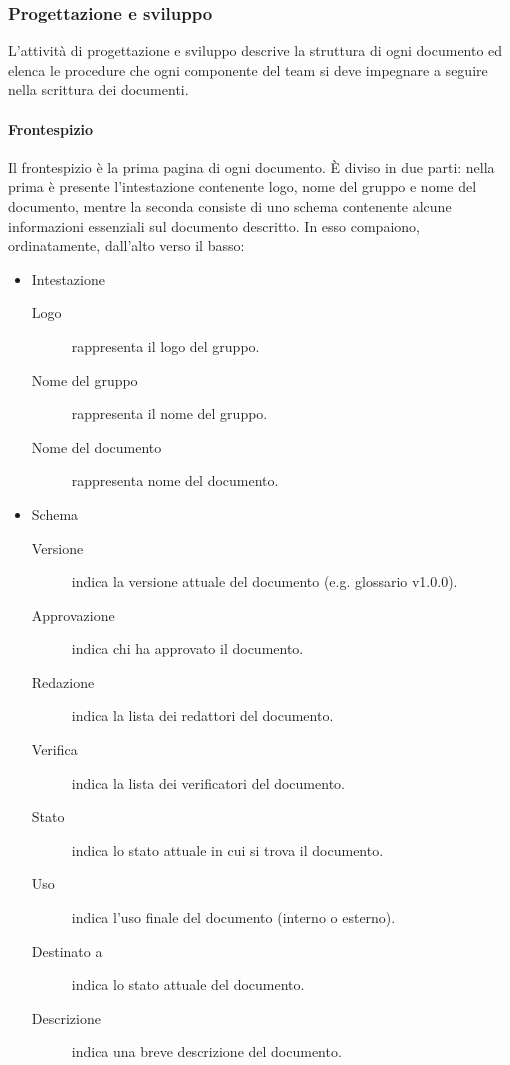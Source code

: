 \documentclass[../norme-di-progetto.tex]{subfiles}
\begin{document}
\subsubsection{Progettazione e sviluppo}%
\label{subs:progettazione_e_sviluppo}

L'attività di progettazione e sviluppo descrive la struttura di ogni documento ed elenca le procedure che ogni componente del team si deve impegnare a seguire nella scrittura dei documenti.

\paragraph{Frontespizio}%
\label{par:frontespizio}
Il frontespizio è la prima pagina di ogni documento. È diviso in due parti: nella prima è presente l'intestazione contenente logo, nome del gruppo e nome del documento, mentre la seconda consiste di uno schema contenente alcune informazioni essenziali sul documento descritto. In esso compaiono, ordinatamente, dall'alto verso il basso:

\begin{itemize}
  \item Intestazione
        \begin{description}
          \item [Logo] rappresenta il logo del gruppo.
          \item [Nome del gruppo] rappresenta il nome del gruppo.
          \item [Nome del documento] rappresenta nome del documento.
        \end{description}
  \item Schema
        \begin{description}
          \item [Versione] indica la versione attuale del documento (e.g\@. glossario v1.0.0).
          \item [Approvazione] indica chi ha approvato il documento.
          \item [Redazione] indica la lista dei redattori del documento.
          \item [Verifica] indica la lista dei verificatori del documento.
          \item [Stato] indica lo stato attuale in cui si trova il documento.
          \item [Uso] indica l'uso finale del documento (interno o esterno).
          \item [Destinato a] indica lo stato attuale del documento.
          \item [Descrizione] indica una breve descrizione del documento.
        \end{description}
\end{itemize}
\end{document}

